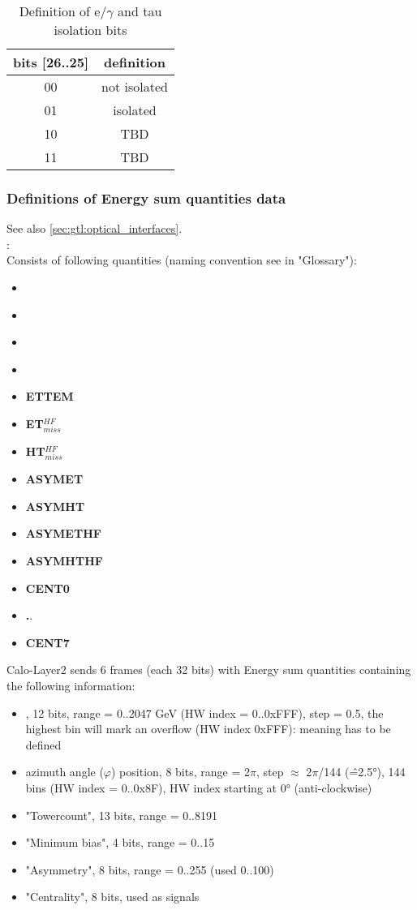 \begin{table}[ht]
\caption{Definition of e/$\gamma$ and tau isolation bits}
\vspace{5mm}
\centering
\begin{tabular}{|c|c|}\hline
bits [26..25] & definition \\\hline\hline
00 & not isolated \\
01 & isolated \\
10 & TBD \\
11 & TBD \\\hline
\end{tabular}
\label{tab:gtl:eg_tau_iso_bits}
\end{table}

\clearpage

\subsubsection{Definitions of Energy sum quantities data}

See also \ref{sec:gtl:optical_interfaces}.\\
\textbf{\esums}:\\ Consists of following quantities (naming convention see in "Glossary"):
\begin{itemize}
\item \textbf{\ett}
\item \textbf{\htt}
\item \textbf{\etm}
\item \textbf{\htm}
\item \textbf{ETTEM}
\item \textbf{ET$_{miss}^{HF}$}
\item \textbf{HT$_{miss}^{HF}$}
\item \textbf{ASYMET}
\item \textbf{ASYMHT}
\item \textbf{ASYMETHF}
\item \textbf{ASYMHTHF}
\item \textbf{CENT0}
\item \textbf..
\item \textbf{CENT7}
\end{itemize}

Calo-Layer2 sends 6 frames (each 32 bits) with Energy sum quantities containing the following information:
\begin{itemize}
\item \et, 12 bits, range = 0..2047 GeV (HW index = 0..0xFFF), step = 0.5, the highest bin will mark an overflow (HW index 0xFFF): meaning has to be defined
\item azimuth angle ($\varphi$) position, 8 bits, range = 2$\pi$, step $\approx$ 2$\pi$/144 (\^=2.5°), 144 bins (HW index = 0..0x8F), HW index starting at 0° (anti-clockwise)
\item "Towercount", 13 bits, range = 0..8191
\item "Minimum bias", 4 bits, range = 0..15
\item "Asymmetry", 8 bits, range = 0..255 (used 0..100)
\item "Centrality", 8 bits, used as signals
\end{itemize}

